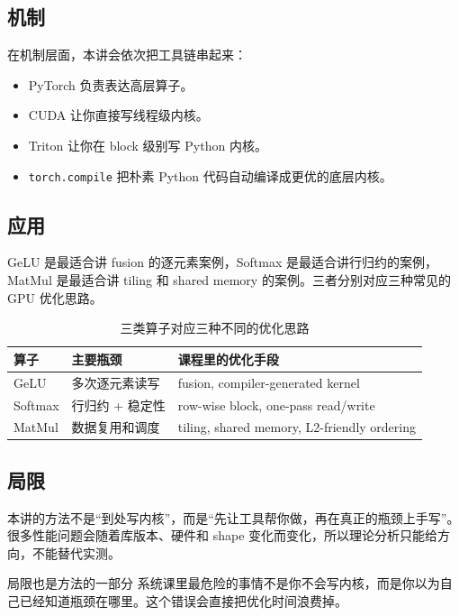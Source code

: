 \documentclass[a4paper]{article}
\begin{document}
\subsection{机制}

在机制层面，本讲会依次把工具链串起来：
\begin{itemize}
    \item PyTorch 负责表达高层算子。
    \item CUDA 让你直接写线程级内核。
    \item Triton 让你在 block 级别写 Python 内核。
    \item \texttt{torch.compile} 把朴素 Python 代码自动编译成更优的底层内核。
\end{itemize}

\subsection{应用}

GeLU 是最适合讲 fusion 的逐元素案例，Softmax 是最适合讲行归约的案例，MatMul 是最适合讲 tiling 和 shared memory 的案例。三者分别对应三种常见的 GPU 优化思路。

\begin{table}[H]
\centering
\begin{tabular}{p{3.2cm}p{3.8cm}p{5.4cm}}
\toprule
\textbf{算子} & \textbf{主要瓶颈} & \textbf{课程里的优化手段} \\
\midrule
GeLU & 多次逐元素读写 & fusion, compiler-generated kernel \\
Softmax & 行归约 + 稳定性 & row-wise block, one-pass read/write \\
MatMul & 数据复用和调度 & tiling, shared memory, L2-friendly ordering \\
\bottomrule
\end{tabular}
\caption{三类算子对应三种不同的优化思路}
\end{table}

\subsection{局限}

本讲的方法不是“到处写内核”，而是“先让工具帮你做，再在真正的瓶颈上手写”。很多性能问题会随着库版本、硬件和 shape 变化而变化，所以理论分析只能给方向，不能替代实测。

\begin{knowledgebox}{局限也是方法的一部分}
系统课里最危险的事情不是你不会写内核，而是你以为自己已经知道瓶颈在哪里。这个错误会直接把优化时间浪费掉。
\end{knowledgebox}
\end{document}

